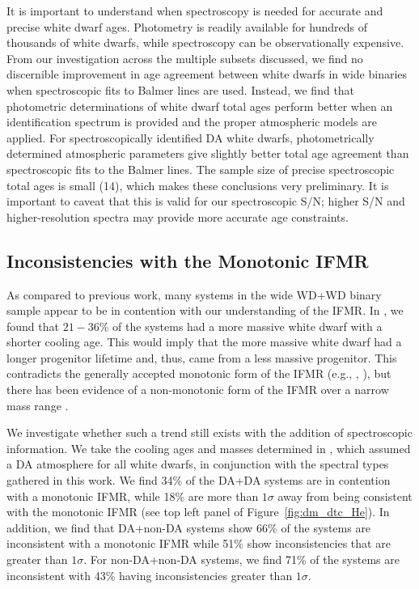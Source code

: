 \documentclass[twocolumn]{aastex631}
\begin{document}
It is important to understand when spectroscopy is needed for accurate and precise white dwarf ages. Photometry is readily available for hundreds of thousands of white dwarfs, while spectroscopy can be observationally expensive. From our investigation across the multiple subsets discussed, we find no discernible improvement in age agreement between white dwarfs in wide binaries when spectroscopic fits to Balmer lines are used. Instead, we find that photometric determinations of white dwarf total ages perform better when an identification spectrum is provided and the proper atmospheric models are applied. For spectroscopically identified DA white dwarfs, photometrically determined atmospheric parameters give slightly better total age agreement than spectroscopic fits to the Balmer lines. The sample size of precise spectroscopic total ages is small (14), which makes these conclusions very preliminary. It is important to caveat that this is valid for our spectroscopic S/N; higher S/N and higher-resolution spectra may provide more accurate age constraints.

\subsection{Inconsistencies with the Monotonic IFMR}\label{sec:inconsist}
As compared to previous work, many systems in the wide WD+WD binary sample appear to be in contention with our understanding of the IFMR. In \cite{2022ApJ...934..148H}, we found that $21-36$\% of the systems had a more massive white dwarf with a shorter cooling age. This would imply that the more massive white dwarf had a longer progenitor lifetime and, thus, came from a less massive progenitor. This contradicts the generally accepted monotonic form of the IFMR (e.g., \citealt{2018ApJ...866...21C}, \citealt{2018ApJ...860L..17E}), but there has been evidence of a non-monotonic form of the IFMR over a narrow mass range \citep{2020NatAs...4.1102M}.

We investigate whether such a trend still exists with the addition of spectroscopic information. We take the cooling ages and masses determined in \cite{2022ApJ...934..148H}, which assumed a DA atmosphere for all white dwarfs, in conjunction with the spectral types gathered in this work. We find 34\% of the DA+DA systems are in contention with a monotonic IFMR, while 18\% are more than $1\sigma$ away from being consistent with the monotonic IFMR (see top left panel of Figure~\ref{fig:dm_dtc_He}). In addition, we find that DA+non-DA systems show 66\% of the systems are inconsistent with a monotonic IFMR while 51\% show inconsistencies that are greater than $1\sigma$. For non-DA+non-DA systems, we find 71\% of the systems are inconsistent with 43\% having inconsistencies greater than $1\sigma$.
\end{document}
